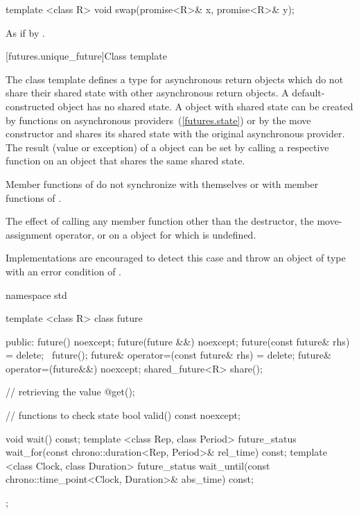 %
%
\begin{itemdecl}
template <class R>
  void swap(promise<R>& x, promise<R>& y);
\end{itemdecl}

\begin{itemdescr}
\pnum
\effects As if by .
\end{itemdescr}

[futures.unique_future]{Class template }

\pnum
The class template  defines a type for asynchronous return objects which
do not share their shared state with other asynchronous return objects.
A default-constructed  object has no
shared state. A  object with shared state can be created by
functions on asynchronous providers~(\ref{futures.state}) or by the move constructor
and shares its shared state with
the original asynchronous provider. The result (value or exception) of
a  object
can be
set by
calling a respective function on an
object that shares the same
shared state.

\pnum
\begin{note} Member functions of  do not synchronize with themselves or with
member functions of . \end{note}

\pnum
The effect of calling any member function other than the destructor, the
move-assignment operator, or  on a  object for which
is undefined.
\begin{note} Implementations are encouraged to detect this case and throw an object of type
 with an error condition of . \end{note}

\begin{codeblock}
namespace std {
  template <class R>
  class future {
  public:
    future() noexcept;
    future(future &&) noexcept;
    future(const future& rhs) = delete;
    ~future();
    future& operator=(const future& rhs) = delete;
    future& operator=(future&&) noexcept;
    shared_future<R> share();

    // retrieving the value
    @\seebelow@ get();

    // functions to check state
    bool valid() const noexcept;

    void wait() const;
    template <class Rep, class Period>
      future_status wait_for(const chrono::duration<Rep, Period>& rel_time) const;
    template <class Clock, class Duration>
      future_status wait_until(const chrono::time_point<Clock, Duration>& abs_time) const;
  };
}
\end{codeblock}

